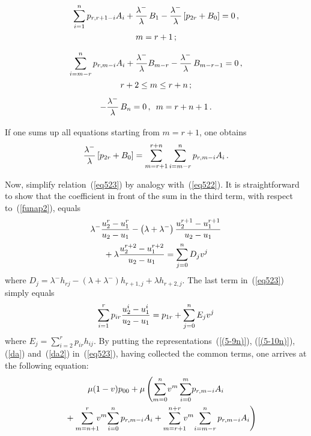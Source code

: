 \begin{multicols}{2}
\vspace*{-12pt}

\noindent
\begin{multline}
\sum\limits_{i=1}^n p_{r,r+1-i} A_i + \displaystyle\frac{\displaystyle \lambda^- \mathstrut}{\displaystyle \lambda \mathstrut}\,B_{1}
- \displaystyle\frac{\displaystyle \lambda^-\mathstrut}{\displaystyle \lambda \mathstrut} \left[p_{2r}+B_0\right] =0\,,
\\ m = r+1\,;
\label{e5-18nc}
\end{multline}
\vspace*{-12pt}

\noindent
\begin{multline}
\sum\limits_{i=m-r}^n p_{r,m-i} A_i + \displaystyle\frac{\displaystyle \lambda^-\mathstrut}{\displaystyle \lambda \mathstrut}B_{m-r}
- \displaystyle\frac{\displaystyle \lambda^- \mathstrut}{\displaystyle \lambda \mathstrut} \,B_{m-r-1} =0\,, \\
 r+2 \le m \le r+n\,;
\label{e5-18nd}
\end{multline}
\begin{equation}
-\displaystyle\frac{\displaystyle \lambda^-\mathstrut}{\displaystyle \lambda \mathstrut}\, B_{n}=0\,, \enskip  m = r+n+1\,. 
\label{e5-18ne}
\end{equation}

If one sums up all equations starting from $m=r+1$, one obtains
\begin{equation}
\label{conn}
\displaystyle\frac{\displaystyle \lambda^- \mathstrut}{\displaystyle \lambda \mathstrut} \left[p_{2r}+B_0\right] =
\sum\limits_{m=r+1}^{r+n} \sum\limits_{i=m-r}^n p_{r,m-i} A_i\,.
\end{equation}

Now, simplify relation~(\ref{eq523}) by analogy with~(\ref{eq522}).
It is straightforward to show that the coefficient in front of the sum
in the third term, with respect to~(\ref{funap2}), equals
\begin{multline}
\label{da}
\lambda^- \displaystyle\frac{\displaystyle u^r_2 - u^r_1 \mathstrut}{\displaystyle u_2-u_1\mathstrut} -
\left(\lambda + \lambda^-\right) \displaystyle\frac{\displaystyle u^{r+1}_2 - u^{r+1}_1\mathstrut}{\displaystyle u_2-u_1\mathstrut}\\
{}+
\lambda \displaystyle\frac{\displaystyle u^{r+2}_2 - u^{r+2}_1\mathstrut}{\displaystyle u_2-u_1\mathstrut} = \sum\limits_{j=0}^n
D_j v^j 
\end{multline}
where $D_j = \lambda^- h_{rj} - (\lambda + \lambda^-) h_{r+1,j} +
\lambda h_{r+2,j}$. The last term in~(\ref{eq523}) simply equals
\begin{equation}
\label{da2}
\sum\limits_{i=1}^{r} p_{ir} \displaystyle\frac{\displaystyle  u_2^{i} - u_1^{i} \mathstrut}{\displaystyle u_2-u_1\mathstrut} = p_{1r} +
 \sum\limits_{j=0}^n E_j v^j
\end{equation}
where $E_j= \sum_{i=2}^{r} p_{ir} h_{ij}$.
By putting the representations~(\ref{(5-9n)}), (\ref{(5-10n)}), (\ref{da}) 
and~(\ref{da2}) in~(\ref{eq523}), having collected the common terms, one arrives at the
following equation: 
\begin{multline*}
\mu (1-v)p_{00} + \mu \left (
\sum\limits_{m=0}^n \!v^m \sum\limits_{i=0}^{m} \!p_{r,m-i} A_i\right.\\
\left.{} +
\sum\limits_{m=n+1}^r\!\!\! v^m \!
\sum\limits_{i=0}^{n} p_{r,m-i} A_i + 
\sum\limits_{m=r+1}^{n+r}\!\! \!v^m \! \sum\limits_{i=m-r}^{n} p_{r,m-i} A_i
\right)\hspace*{-9.41606pt}
\end{multline*}


\end{multicols}
